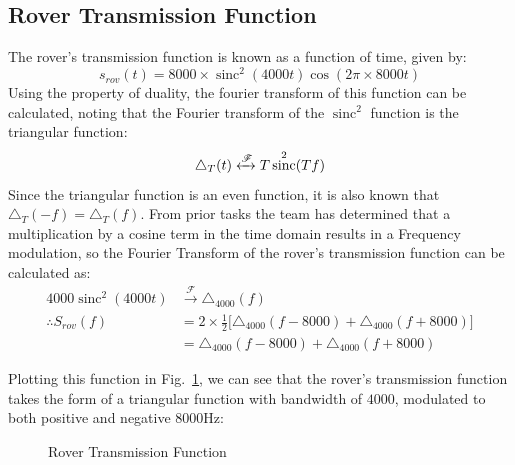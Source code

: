 \documentclass[12pt]{article}
\DeclareMathOperator{\sinc}{sinc}
\numberwithin{equation}{section}
\numberwithin{figure}{section}
\numberwithin{table}{section}
\begin{document}
\subsection{Rover Transmission Function}
The rover's transmission function is known as a function of time, given by:
\begin{equation*}
    s_{rov}(t) = 8000 \times \sinc^2(4000t)\cos(2\pi \times 8000t)
\end{equation*}
Using the property of duality, the fourier transform of this function can be
calculated, noting that the Fourier transform of the $\sinc^2$ function is the
triangular function:
\begin{equation*}
    \triangle_T(t) \xleftrightarrow{\mathscr{F}} T\sinc^2(Tf)
\end{equation*}
Since the triangular function is an even function, it is also known that
$\triangle_T(-f) = \triangle_T(f)$. From prior tasks the team has determined
that a multiplication by a cosine term in the time domain results in a Frequency
modulation, so the Fourier Transform of the rover's transmission function can be
calculated as:
\begin{align*}
    4000 \sinc^2(4000t)   & \xrightarrow{\mathscr{F}} \triangle_{4000}(f)                                           \\
    \therefore S_{rov}(f) & = 2 \times \frac{1}{2} \bigg[ \triangle_{4000}(f-8000) + \triangle_{4000}(f+8000)\bigg] \\
                          & = \triangle_{4000}(f-8000) + \triangle_{4000}(f+8000)
\end{align*}

Plotting this function in Fig.~\ref{fig:p1-rov}, we can see that the rover's
transmission function takes the form of a triangular function with bandwidth of
$4000$, modulated to both positive and negative $8000$Hz:

\begin{figure}[ht]
    \centering
    \caption{Rover Transmission Function\label{fig:p1-rov}}
\end{figure}
\end{document}
